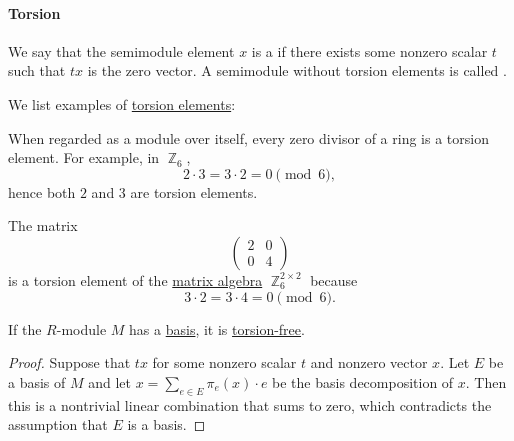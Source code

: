 \paragraph{Torsion}

\begin{definition}\label{def:semimodule_torsion}\mimprovised
  We say that the semimodule element \( x \) is a  if there exists some nonzero scalar \( t \) such that \( tx \) is the zero vector. A semimodule without torsion elements is called .
\end{definition}

\begin{example}\label{ex:def:semimodule_torsion}
  We list examples of \hyperref[def:semimodule_torsion]{torsion elements}:
  \begin{thmenum}
     When regarded as a module over itself, every zero divisor of a ring is a torsion element. For example, in \( \BbbZ_6 \),
    \begin{equation*}
      2 \cdot 3 = 3 \cdot 2 = 0 \pmod 6,
    \end{equation*}
    hence both \( 2 \) and \( 3 \) are torsion elements.

     The matrix
    \begin{equation*}
      \begin{pmatrix}
        2 & 0 \\
        0 & 4
      \end{pmatrix}
    \end{equation*}
    is a torsion element of the \hyperref[thm:matrix_algebra]{matrix algebra} \( \BbbZ_6^{2 \times 2} \) because
    \begin{equation*}
      3 \cdot 2 = 3 \cdot 4 = 0 \pmod 6.
    \end{equation*}
  \end{thmenum}
\end{example}

\begin{proposition}\label{thm:basis_implies_torsion_free}
  If the \( R \)-module \( M \) has a \hyperref[def:hamel_basis]{basis}, it is \hyperref[def:semimodule_torsion]{torsion-free}.
\end{proposition}
\begin{proof}
  Suppose that \( tx \) for some nonzero scalar \( t \) and nonzero vector \( x \). Let \( E \) be a basis of \( M \) and let \( x = \sum_{e \in E} \pi_e(x) \cdot e \) be the basis decomposition of \( x \). Then this is a nontrivial linear combination that sums to zero, which contradicts the assumption that \( E \) is a basis.
\end{proof}

